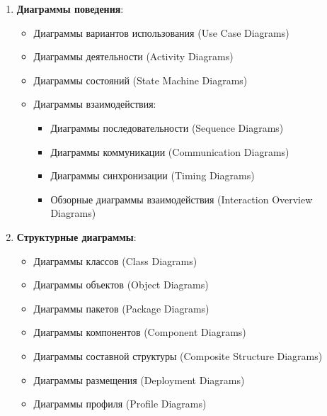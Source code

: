\documentclass[a4paper, 12pt]{report}
\numberwithin{equation}{section}
\begin{document}
\begin{enumerate}
    \item \textbf{Диаграммы поведения}:
    \begin{itemize}
        \item Диаграммы вариантов использования (Use Case Diagrams)
        \item Диаграммы деятельности (Activity Diagrams)
        \item Диаграммы состояний (State Machine Diagrams)
        \item Диаграммы взаимодействия:
        \begin{itemize}
            \item Диаграммы последовательности (Sequence Diagrams)
            \item Диаграммы коммуникации (Communication Diagrams)
            \item Диаграммы синхронизации (Timing Diagrams)
            \item Обзорные диаграммы взаимодействия (Interaction Overview Diagrams)
        \end{itemize}
    \end{itemize}
    \item \textbf{Структурные диаграммы}:
    \begin{itemize}
        \item Диаграммы классов (Class Diagrams)
        \item Диаграммы объектов (Object Diagrams)
        \item Диаграммы пакетов (Package Diagrams)
        \item Диаграммы компонентов (Component Diagrams)
        \item Диаграммы составной структуры (Composite Structure Diagrams)
        \item Диаграммы размещения (Deployment Diagrams)
        \item Диаграммы профиля (Profile Diagrams)
    \end{itemize}
\end{enumerate}
\end{document}
